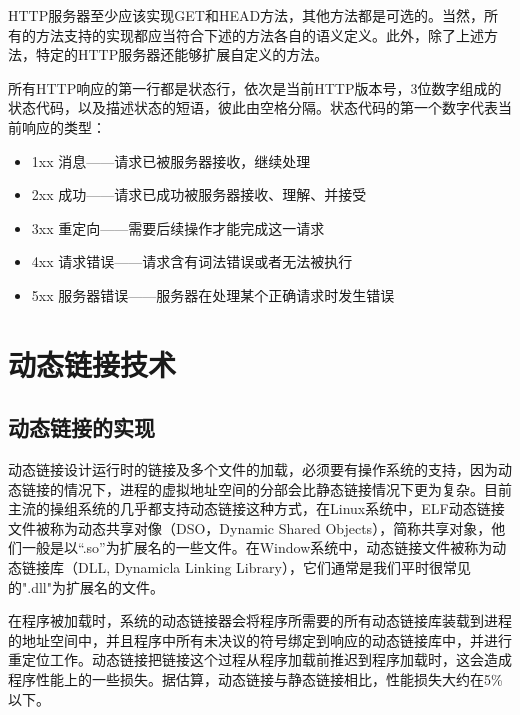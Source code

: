 \documentclass[twoside, xetex]{report}
\begin{document}
	HTTP服务器至少应该实现GET和HEAD方法，其他方法都是可选的。当然，所有的方法支持的实现都应当符合下述的方法各自的语义定义。此外，除了上述方法，特定的HTTP服务器还能够扩展自定义的方法。
	
	所有HTTP响应的第一行都是状态行，依次是当前HTTP版本号，3位数字组成的状态代码，以及描述状态的短语，彼此由空格分隔。状态代码的第一个数字代表当前响应的类型：
	\begin{itemize}
		\item 1xx 消息——请求已被服务器接收，继续处理
		\item 2xx 成功——请求已成功被服务器接收、理解、并接受
		\item 3xx 重定向——需要后续操作才能完成这一请求
		\item 4xx 请求错误——请求含有词法错误或者无法被执行
		\item 5xx 服务器错误——服务器在处理某个正确请求时发生错误
	\end{itemize}
\section{动态链接技术}
	\subsection{动态链接的实现}
	动态链接设计运行时的链接及多个文件的加载，必须要有操作系统的支持，因为动态链接的情况下，进程的虚拟地址空间的分部会比静态链接情况下更为复杂。目前主流的操组系统的几乎都支持动态链接这种方式，在Linux系统中，ELF动态链接文件被称为动态共享对像（DSO，Dynamic Shared Objects），简称共享对象，他们一般是以“.so”为扩展名的一些文件。在Window系统中，动态链接文件被称为动态链接库（DLL, Dynamicla Linking Library），它们通常是我们平时很常见的".dll"为扩展名的文件。
	
	在程序被加载时，系统的动态链接器会将程序所需要的所有动态链接库装载到进程的地址空间中，并且程序中所有未决议的符号绑定到响应的动态链接库中，并进行重定位工作。动态链接把链接这个过程从程序加载前推迟到程序加载时，这会造成程序性能上的一些损失。据估算，动态链接与静态链接相比，性能损失大约在5\%以下。
	
\end{document}
